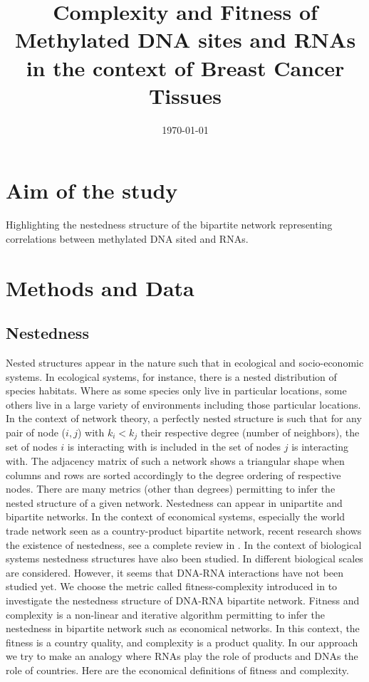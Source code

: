\documentclass[10pt,a4paper]{article}
\title{Complexity and Fitness of Methylated DNA sites and RNAs in the context of Breast Cancer Tissues}
\date{\today}
\begin{document}
\maketitle
\section{Aim of the study}
Highlighting the nestedness structure of the bipartite network representing correlations between methylated DNA sited and RNAs.
\section{Methods and Data}
\subsection{Nestedness}
Nested structures appear in the nature such that in ecological and socio-economic systems. In ecological systems, for instance, there is a nested distribution of species habitats. Where as some species only live in particular locations, some others live in a large variety of environments including those particular locations. In the context of network theory, a perfectly nested structure is such that for any pair of node ($i,j$) with $k_{i} < k_{j}$ their respective degree (number of neighbors), the set of nodes $i$ is interacting with is included in the set of nodes $j$ is interacting with. The adjacency matrix of such a network shows a triangular shape when columns and rows are sorted accordingly to the degree ordering of respective nodes. There are many metrics (other than degrees) permitting to infer the nested structure of a given network. Nestedness can appear in unipartite and bipartite networks. In the context of economical systems, especially the world trade network seen as a country-product bipartite network, recent research shows the existence of nestedness, see a complete review in \cite{mariani19}. In the context of biological systems nestedness structures have also been studied. In \cite{cantor17} different biological scales are considered. However, it seems that DNA-RNA interactions have not been studied yet. We choose the metric called fitness-complexity introduced in \cite{tacchella12} to investigate the nestedness structure of DNA-RNA bipartite network. Fitness and complexity is a non-linear and iterative algorithm permitting to infer the nestedness in bipartite network such as economical networks. In this context, the fitness is a country quality, and complexity is a product quality. In our approach we try to make an analogy where RNAs play the role of products and DNAs the role of countries. Here are the economical definitions of fitness and complexity.
\end{document}
